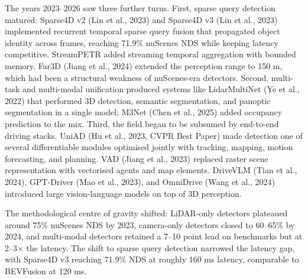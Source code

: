 The years 2023--2026 saw three further turns. First, sparse query detection matured: Sparse4D v2 (Lin et al., 2023) and Sparse4D v3 (Lin et al., 2023) implemented recurrent temporal sparse query fusion that propagated object identity across frames, reaching 71.9\% nuScenes NDS while keeping latency competitive. StreamPETR added streaming temporal aggregation with bounded memory. Far3D (Jiang et al., 2024) extended the perception range to 150 m, which had been a structural weakness of nuScenes-era detectors. Second, multi-task and multi-modal unification produced systems like LidarMultiNet (Ye et al., 2022) that performed 3D detection, semantic segmentation, and panoptic segmentation in a single model; M3Net (Chen et al., 2025) added occupancy prediction to the mix. Third, the field began to be subsumed by end-to-end driving stacks. UniAD (Hu et al., 2023, CVPR Best Paper) made detection one of several differentiable modules optimised jointly with tracking, mapping, motion forecasting, and planning. VAD (Jiang et al., 2023) replaced raster scene representation with vectorised agents and map elements. DriveVLM (Tian et al., 2024), GPT-Driver (Mao et al., 2023), and OmniDrive (Wang et al., 2024) introduced large vision-language models on top of 3D perception.

The methodological centre of gravity shifted: LiDAR-only detectors plateaued around 75\% nuScenes NDS by 2023, camera-only detectors closed to 60--65\% by 2024, and multi-modal detectors retained a 7--10 point lead on benchmarks but at 2--3× the latency. The shift to sparse query detection narrowed the latency gap, with Sparse4D v3 reaching 71.9\% NDS at roughly 160 ms latency, comparable to BEVFusion at 120 ms.

